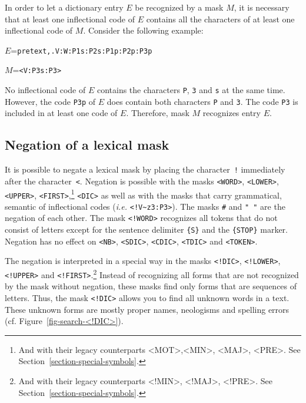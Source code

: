 \noindent In order to let a dictionary entry $E$ be recognized by a mask $M$, it
is necessary that at least one inflectional code of $E$ contains all the characters
of at least one inflectional code of $M$. Consider the following example:

\bigskip
$E$=\verb$pretext,.V:W:P1s:P2s:P1p:P2p:P3p$

$M$=\verb$<V:P3s:P3>$

\bigskip
\noindent No inflectional code of $E$ contains the characters \verb+P+,
\verb+3+ and \verb+s+ at the same time. However, the code \verb+P3p+ of $E$
does contain both characters \verb+P+ and \verb+3+. The code \verb+P3+ is
included in at least one code of $E$. Therefore, mask $M$ recognizes entry $E$.

\subsection{Negation of a lexical mask}
It is possible to negate a lexical mask by placing the character~\verb+!+ immediately
after the character~\verb+<+.
Negation is possible with the masks \verb+<WORD>+, \verb+<LOWER>+, \verb+<UPPER>+,
\verb+<FIRST>+,\footnote{And with their legacy counterparts  <MOT>,<MIN>, <MAJ>,
<PRE>. See Section~\ref{section-special-symbols}.} \verb+<DIC>+ as well as with the masks that carry grammatical,
semantic of inflectional codes (\textit{i.e.} \verb$<!V~z3:P3>$).
The masks \verb+#+ and \verb+" "+ are the negation of each other.
\index{\verbt{\#}} The
mask \verb$<!WORD>$ recognizes all tokens that do not consist of
letters except for the sentence delimiter \verb+{S}+ and the \verb+{STOP}+ marker.
Negation has no effect on \verb+<NB>+, \verb+<SDIC>+, \verb+<CDIC>+, \verb+<TDIC>+ and \verb+<TOKEN>+.

\bigskip
\noindent The negation is interpreted in a special way in the masks
\verb+<!DIC>+, \verb+<!LOWER>+, \verb+<!UPPER>+ and
\verb+<!FIRST>+.\footnote{And with their legacy counterparts <!MIN>, <!MAJ>,
<!PRE>. See Section~\ref{section-special-symbols}.}
Instead of recognizing all forms that are not recognized by the mask without
negation, these masks find only forms that are sequences of letters.
Thus, the mask \verb+<!DIC>+ allows you to find all unknown words in a text.
These unknown forms are mostly proper names, neologisms and spelling errors (cf.
  Figure~\ref{fig-search-<!DIC>}).

